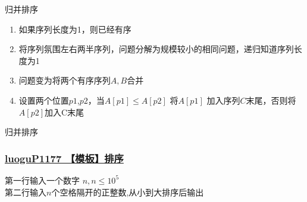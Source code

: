 \documentclass[aspectratio=169,xcolor=dvipsnames]{beamer}
\begin{document}
\begin{frame}{归并排序}
    \begin{enumerate}
        \item 如果序列长度为1，则已经有序
        \item 将序列氛围左右两半序列，问题分解为规模较小的相同问题，递归知道序列长度为1
        \item 问题变为将两个有序序列$A,B$合并
        \item 设置两个位置$p1$,$p2$，当$A[p1] \le A[p2]$ 将$A[p1]$ 加入序列$C$末尾，否则将 $A[p2]$加入C末尾
    \end{enumerate}
\end{frame}


\begin{frame}{归并排序}
\end{frame}

\begin{frame}
    \frametitle{\href{https://www.luogu.com.cn/problem/P1177}{luoguP1177 【模板】排序}}

    第一行输入一个数字 $n, n \le 10^5 $\\
    第二行输入$n$个空格隔开的正整数,从小到大排序后输出
\end{frame}

\end{document}
